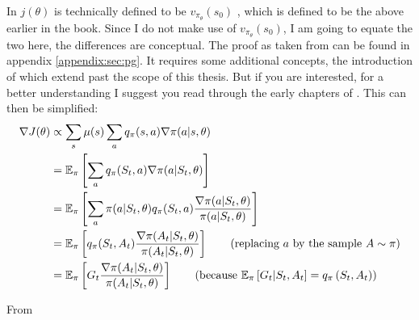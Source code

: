 \noindent
In  $j(\theta)$ is technically defined to be $v_{\pi_\theta}(s_0)$ , which is defined to be the above earlier in the book. Since I do not make use of $v_{\pi_\theta}(s_0)$, I am going to equate the two here, the differences are conceptual. The proof as taken from  can be found in appendix \ref{appendix:sec:pg}. It requires some additional concepts, the introduction of which extend past the scope of this thesis. But if you are interested, for a better understanding I suggest you read through the early chapters of \cite{sutton_reinforcement_2018}. This can then be simplified:
\begin{align}
    \nabla J(\theta) &\propto \sum_{s} \mu(s)\sum_a q_\pi(s,a) \nabla \pi(a|s,\theta) \nonumber \MoveEqLeft[1] \\ 
    &= \mathbb{E}_\pi \left[\sum_a q_\pi(S_t,a) \nabla \pi(a|S_t,\theta)\right] \nonumber \\
    &= \mathbb{E}_\pi \left[\sum_a \pi(a|S_t,\theta) q_\pi(S_t,a) \frac{\nabla \pi(a|S_t,\theta)}{\pi(a|S_t,\theta)}\right] \nonumber \\ 
    &= \mathbb{E}_\pi \left[q_\pi(S_t,A_t) \frac{\nabla \pi(A_t|S_t,\theta)}{\pi(A_t|S_t,\theta)}\right] \nonumber \tag*{(replacing $a$ by the sample $A \sim \pi$)}\\
    &= \mathbb{E}_\pi \left[G_t \frac{\nabla \pi(A_t|S_t,\theta)}{\pi(A_t|S_t,\theta)}\right] \tag*{(because $\mathbb{E}_\pi \left[ G_t|S_t, A_t \right] = q_\pi \left(S_t, A_t \right)$)}
\end{align}

\centerline{From }


